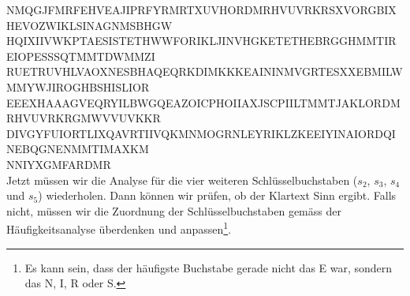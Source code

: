 {\colorbox{green!30}{N}MQGJ\colorbox{green!30}{F}MRFE\colorbox{green!30}{H}VEAJ\colorbox{green!30}{I}PRFY\colorbox{green!30}{R}MRTX\colorbox{green!30}{U}VHOR\colorbox{green!30}{D}MRHV\colorbox{green!30}{U}VRKR\colorbox{green!30}{S}XVOR\colorbox{green!30}{G}BIXH\colorbox{green!30}{E}VOZW\colorbox{green!30}{I}KLSI\colorbox{green!30}{N}AGNM\colorbox{green!30}{S}BHGW\\
\colorbox{green!30}{H}QIXI\colorbox{green!30}{I}VWKP\colorbox{green!30}{T}AESI\colorbox{green!30}{S}TETH\colorbox{green!30}{W}WFOR\colorbox{green!30}{I}KLJI\colorbox{green!30}{N}VHGK\colorbox{green!30}{E}TETH\colorbox{green!30}{E}BRGG\colorbox{green!30}{H}MMTI\colorbox{green!30}{R}EIOP\colorbox{green!30}{E}SSSQ\colorbox{green!30}{T}MMTD\colorbox{green!30}{W}MMZI\\
\colorbox{green!30}{R}UETR\colorbox{green!30}{U}VHLV\colorbox{green!30}{A}OXNE\colorbox{green!30}{S}BHAQ\colorbox{green!30}{E}QRKD\colorbox{green!30}{I}MKKK\colorbox{green!30}{E}AINI\colorbox{green!30}{N}MVGR\colorbox{green!30}{T}ESXX\colorbox{green!30}{E}BMIL\colorbox{green!30}{W}MMYW\colorbox{green!30}{J}IROG\colorbox{green!30}{H}BSHI\colorbox{green!30}{S}LIOR\\
\colorbox{green!30}{E}EEXH\colorbox{green!30}{A}AAGV\colorbox{green!30}{E}QRYI\colorbox{green!30}{L}BWGQ\colorbox{green!30}{E}AZOI\colorbox{green!30}{C}PHOI\colorbox{green!30}{I}AXJS\colorbox{green!30}{C}PIIL\colorbox{green!30}{T}MMTJ\colorbox{green!30}{A}KLOR\colorbox{green!30}{D}MRHV\colorbox{green!30}{U}VRKR\colorbox{green!30}{G}MWVV\colorbox{green!30}{U}VKKR\\
\colorbox{green!30}{D}IVGY\colorbox{green!30}{F}UIOR\colorbox{green!30}{T}LIXQ\colorbox{green!30}{A}VRTI\colorbox{green!30}{I}VQKM\colorbox{green!30}{N}MOGR\colorbox{green!30}{N}LEYR\colorbox{green!30}{I}KLZK\colorbox{green!30}{E}EIYI\colorbox{green!30}{N}AIOR\colorbox{green!30}{D}QINE\colorbox{green!30}{B}QGNE\colorbox{green!30}{N}MMTI\colorbox{green!30}{M}AXKM\\
\colorbox{green!30}{N}NIYX\colorbox{green!30}{G}MFAR\colorbox{green!30}{D}MR
}\\
\normalsize
Jetzt müssen wir die Analyse für die vier weiteren Schlüsselbuchstaben ($s_2$, $s_3$, $s_4$ und $s_5$) wiederholen. Dann können wir prüfen, ob der Klartext Sinn ergibt. Falls nicht, müssen wir die Zuordnung der Schlüsselbuchstaben gemäss der Häufigkeitsanalyse überdenken und anpassen\footnote{Es kann sein, dass der häufigste Buchstabe gerade nicht das E war, sondern das N, I, R oder S.}.

